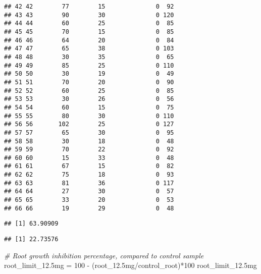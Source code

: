 \documentclass[
]{article}
\newenvironment{Shaded}{\begin{snugshade}}{\end{snugshade}}
\newcommand{\CommentTok}[1]{\textcolor[rgb]{0.56,0.35,0.01}{\textit{#1}}}
\newcommand{\DecValTok}[1]{\textcolor[rgb]{0.00,0.00,0.81}{#1}}
\newcommand{\FloatTok}[1]{\textcolor[rgb]{0.00,0.00,0.81}{#1}}
\newcommand{\FunctionTok}[1]{\textcolor[rgb]{0.00,0.00,0.00}{#1}}
\newcommand{\NormalTok}[1]{#1}
\newcommand{\OtherTok}[1]{\textcolor[rgb]{0.56,0.35,0.01}{#1}}
\newcommand{\SpecialCharTok}[1]{\textcolor[rgb]{0.00,0.00,0.00}{#1}}
\begin{document}
\begin{verbatim}
## 42 42        77        15              0  92
## 43 43        90        30              0 120
## 44 44        60        25              0  85
## 45 45        70        15              0  85
## 46 46        64        20              0  84
## 47 47        65        38              0 103
## 48 48        30        35              0  65
## 49 49        85        25              0 110
## 50 50        30        19              0  49
## 51 51        70        20              0  90
## 52 52        60        25              0  85
## 53 53        30        26              0  56
## 54 54        60        15              0  75
## 55 55        80        30              0 110
## 56 56       102        25              0 127
## 57 57        65        30              0  95
## 58 58        30        18              0  48
## 59 59        70        22              0  92
## 60 60        15        33              0  48
## 61 61        67        15              0  82
## 62 62        75        18              0  93
## 63 63        81        36              0 117
## 64 64        27        30              0  57
## 65 65        33        20              0  53
## 66 66        19        29              0  48
\end{verbatim}

\begin{Shaded}
\end{Shaded}

\begin{verbatim}
## [1] 63.90909
\end{verbatim}

\begin{Shaded}
\end{Shaded}

\begin{verbatim}
## [1] 22.73576
\end{verbatim}

\begin{Shaded}
\begin{Highlighting}[]
\CommentTok{\# Root growth inhibition percentage, compared to control sample}
\NormalTok{root\_limit\_12}\FloatTok{.5}\NormalTok{mg }\OtherTok{=} \DecValTok{100} \SpecialCharTok{{-}}\NormalTok{ (root\_12}\FloatTok{.5}\NormalTok{mg}\SpecialCharTok{/}\NormalTok{control\_root)}\SpecialCharTok{*}\DecValTok{100}
\NormalTok{root\_limit\_12}\FloatTok{.5}\NormalTok{mg}
\end{Highlighting}
\end{Shaded}
\end{document}
